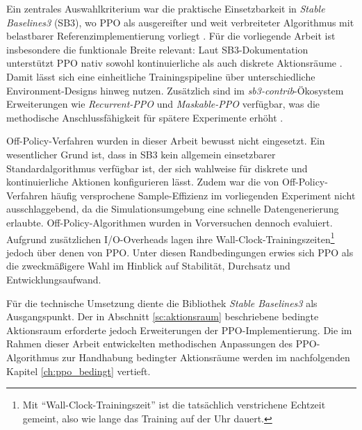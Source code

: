 Ein zentrales Auswahlkriterium war die praktische Einsetzbarkeit in \textit{Stable Baselines3} (\ac{SB3}), wo \ac{PPO} als ausgereifter und weit verbreiteter Algorithmus mit belastbarer Referenzimplementierung vorliegt \cite{sb3,sb3_algos_doc}.
Für die vorliegende Arbeit ist insbesondere die funktionale Breite relevant: Laut \ac{SB3}\hyp{}Dokumentation unterstützt \ac{PPO} nativ sowohl kontinuierliche als auch diskrete Aktionsräume \cite{sb3_algos_doc}.
Damit lässt sich eine einheitliche Trainingspipeline über unterschiedliche Environment\hyp{}Designs hinweg nutzen.
Zusätzlich sind im \textit{sb3\hyp{}contrib}\hyp{}Ökosystem Erweiterungen wie \textit{Recurrent\hyp{}\ac{PPO}} und \textit{Maskable\hyp{}\ac{PPO}} verfügbar, was die methodische Anschlussfähigkeit für spätere Experimente erhöht \cite{sb3_algos_doc}.
\medskip

Off\hyp{}Policy\hyp{}Verfahren wurden in dieser Arbeit bewusst nicht eingesetzt.
Ein wesentlicher Grund ist, dass in \ac{SB3} kein allgemein einsetzbarer Standardalgorithmus verfügbar ist, der sich wahlweise für diskrete und kontinuierliche Aktionen konfigurieren lässt.
Zudem war die von Off\hyp{}Policy\hyp{}Verfahren häufig versprochene Sample\hyp{}Effizienz im vorliegenden Experiment nicht ausschlaggebend, da die Simulationsumgebung eine schnelle Datengenerierung erlaubte.
Off\hyp{}Policy\hyp{}Algorithmen wurden in Vorversuchen dennoch evaluiert. Aufgrund zusätzlichen I/O\hyp{}Overheads lagen ihre Wall\hyp{}Clock\hyp{}Trainingszeiten\footnote{Mit \enquote{Wall\hyp{}Clock\hyp{}Trainingszeit} ist die tatsächlich verstrichene Echtzeit gemeint, also wie lange das Training auf der Uhr dauert.} jedoch über denen von \ac{PPO}.
Unter diesen Randbedingungen erwies sich \ac{PPO} als die zweckmäßigere Wahl im Hinblick auf Stabilität, Durchsatz und Entwicklungsaufwand.
\medskip

Für die technische Umsetzung diente die Bibliothek \textit{Stable Baselines3} \cite{sb3} als Ausgangspunkt.
Der in Abschnitt \ref{sc:aktionsraum} beschriebene bedingte Aktionsraum erforderte jedoch Erweiterungen der \acs{PPO}\hyp{}Implementierung.
Die im Rahmen dieser Arbeit entwickelten methodischen Anpassungen des \ac{PPO}\hyp{}Algorithmus zur Handhabung bedingter Aktionsräume werden im nachfolgenden Kapitel \ref{ch:ppo_bedingt} vertieft.
